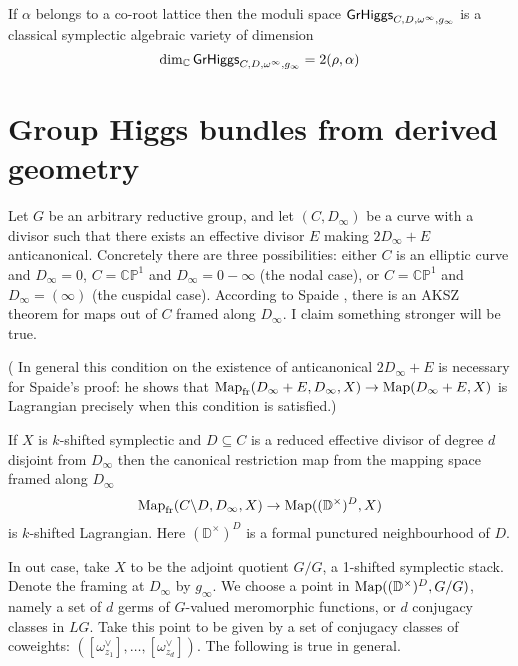 \documentclass[12pt,psamsfonts,reqno]{amsart}
\begin{document}
\begin{proposition}
If $\alpha$ belongs to a co-root lattice then the
 moduli space $\mathsf{GrHiggs}_{C,D,\omega^{\infty}, g_\infty}$ 
 is a classical symplectic algebraic variety of dimension
 \begin{equation}
   \dim_{\mathbb C} \mathsf{GrHiggs}_{C,D,\omega^{\infty}, g_\infty} = 2 ( \rho, \alpha)
 \end{equation}
\end{proposition}






\section{Group Higgs bundles from derived geometry}

Let $G$ be an arbitrary reductive group, and let $(C,D_\infty)$ be a curve with a divisor such that there exists an effective divisor $E$ making $2D_\infty+E$ anticanonical.  Concretely there are three possibilities: either $C$ is an elliptic curve and $D_\infty = 0$, $C = \mathbb{CP}^1$ and $D_\infty=0-\infty$ (the nodal case), or $C=\mathbb{CP}^1$ and $D_\infty = (\infty)$ (the cuspidal case).  According to Spaide \cite{Spaide2016}, there is an AKSZ theorem for maps out of $C$ framed along $D_\infty$.  I claim something stronger will be true.

( In general this condition on the existence of anticanonical $2D_\infty + E$ is necessary for Spaide's proof: he shows that $\operatorname{Map}_{\mathrm{fr}}(D_\infty + E, D_\infty, X) \to \operatorname{Map}(D_\infty + E, X)$ is Lagrangian precisely when this condition is satisfied.)


\begin{claim}
If $X$ is $k$-shifted symplectic and $D \subseteq C$ is a reduced effective divisor of degree $d$ disjoint from $D_\infty$ then the canonical restriction map from the mapping space framed along $D_\infty$
\[\operatorname{Map}_{\mathrm{fr}}(C \backslash D, D_\infty, X) \to \operatorname{Map}((\mathbb{D}^\times)^D, X)\]
is $k$-shifted Lagrangian.  Here $(\mathbb{D}^\times)^D$ is a formal punctured neighbourhood of $D$.
\end{claim}

In out case, take $X$ to be the adjoint quotient $G/G$, a 1-shifted symplectic stack.  Denote the framing at $D_\infty$ by $g_\infty$.  We choose a point in $\operatorname{Map}((\mathbb{D}^\times)^D, G/G)$, namely a set of $d$ germs of $G$-valued meromorphic functions, or $d$ conjugacy classes in $LG$.  Take this point to be given by a set of conjugacy classes of coweights: $([\omega_{z_1}^\vee], \ldots, [\omega_{z_d}^\vee])$.  The following is true in general.
\end{document}
